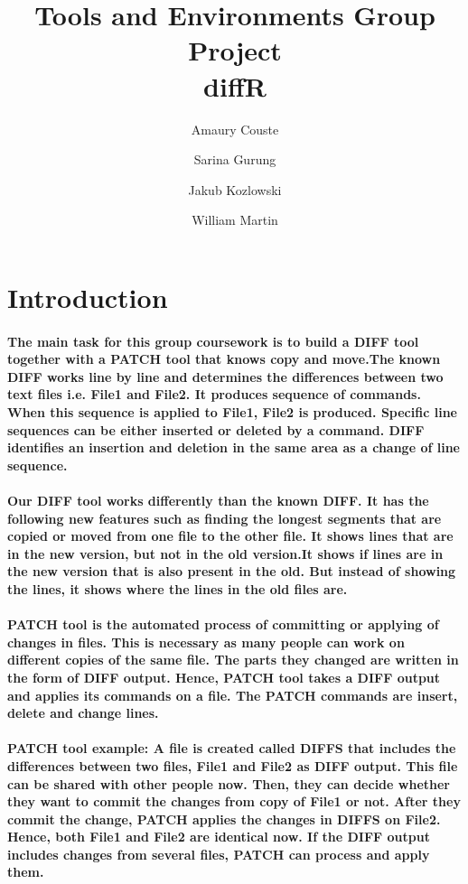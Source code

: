 \documentclass[10pt,a4paper]{report}
\author{Amaury Couste
\and Sarina Gurung
\and Jakub Kozlowski
\and William Martin}
\title{Tools and Environments Group Project\\diffR}
\begin{document}
\maketitle
\section{Introduction}

\paragraph{The main task for this group coursework is to build a DIFF tool together with a PATCH tool that knows copy and move.The known DIFF works line by line and determines the differences between two text files i.e. File1 and File2. It produces sequence of commands. When this sequence is applied to File1, File2 is produced. Specific line sequences can be either inserted or deleted by a command. DIFF identifies an insertion and deletion in the same area as a change of line sequence.}

\paragraph{Our DIFF tool works differently than the known DIFF. It has the following new features such as finding the longest segments that are copied or moved from one file to the other file. It shows lines that are in the new version, but not in the old version.It shows if lines are in the new version that is also present in the old. But instead of showing the lines, it shows where the lines in the old files are.}

\paragraph{PATCH tool is the automated process of committing or applying of changes in files. This is necessary as many people can work on different copies of the same file. The parts they changed are written in the form of DIFF output. Hence, PATCH tool takes a DIFF output and applies its commands on a file. The PATCH commands are insert, delete and change lines. }

\paragraph{PATCH tool example: A file is created called DIFFS that includes the differences between two files, File1 and File2 as DIFF output. This file can be shared with other people now. Then, they can decide whether they want to commit the changes from copy of File1 or not. After they commit the change, PATCH applies the changes in DIFFS on File2. Hence, both File1 and File2 are identical now. If the DIFF output includes changes from several files, PATCH can process and apply them.}
\end{document}
